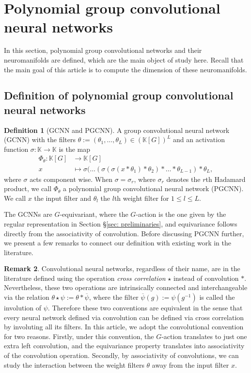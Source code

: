\documentclass[final]{article}
\newcommand{\K}{\mathbb{K}}
\newcommand{\ccr}{\star}
\newcommand{\conv}{\ast}
\theoremstyle{definition}
\newtheorem{definition}{Definition}[section] %
\newtheorem{remark}[definition]{Remark}
\theoremstyle{plain}
\begin{document}
\section{Polynomial group convolutional neural networks}\label{sec: pgcnn}


In this section, polynomial group convolutional networks and their neuromanifolds are defined, which are the main object of study here. 
Recall that the main goal of this article is to compute the dimension of these neuromanifolds.

\subsection{Definition of polynomial group convolutional neural networks}
\begin{definition}[GCNN and PGCNN]\label{def: GCNN}
    A group convolutional neural network (GCNN) with the filters $\theta:=(\theta_1, \dots, \theta_{L}) \in (\K[G])^L$ and an activation function $\sigma: \K \to \K$ is the map
    \begin{align*}
       \Phi_\theta: \K[G] &\to \K[G] \\
        x &\mapsto \sigma(\hdots(\sigma(\sigma(x \conv \theta_1) \conv \theta_2)\conv \hdots \conv \theta_{L-1}) \conv \theta_{L},
    \end{align*}
    where $\sigma$ acts component wise.
    When $\sigma = \sigma_r$, where $\sigma_r$ denotes the $r$th Hadamard product,  we call $\Phi_\theta$ a polynomial group convolutional neural network (PGCNN). 
    We call $x$ the input filter and $\theta_l$ the $l$th weight filter for $1\leq l \leq L$.
\end{definition}

The GCNNs are $G$-equivariant, where the $G$-action is the one given by the regular representation in Section §\ref{sec: preliminaries}, and equivariance follows directly from the associativity of convolution. Before discussing PGCNN further, we present a few remarks to connect our definition with existing work in the literature.

\begin{remark}
Convolutional neural networks, regardless of their name, are in the literature defined using the operation \emph{cross correlation} $\ccr$ instead of convolution $\conv$. Nevertheless, these two operations are intrinsically connected and interchangeable via the relation $\theta \ccr \psi := \theta \conv \overline{\psi}$, where the filter $\overline{\psi}(g) := \psi(g^{-1})$ is called the involution of $\psi$.
Therefore these two conventions are equivalent in the sense that every neural network defined via convolution can be defined via cross correlation by involuting all its filters. 
In this article, we adopt the convolutional convention for two reasons. Firstly, under this convention, the $G$-action translates to just one extra left convolution, and the equivariance property translates into associativity of the convolution operation. Secondly, by associativity of convolutions, we can study the interaction between the weight filters $\theta$ away from the input filter $x$.
\end{remark}
\end{document}
